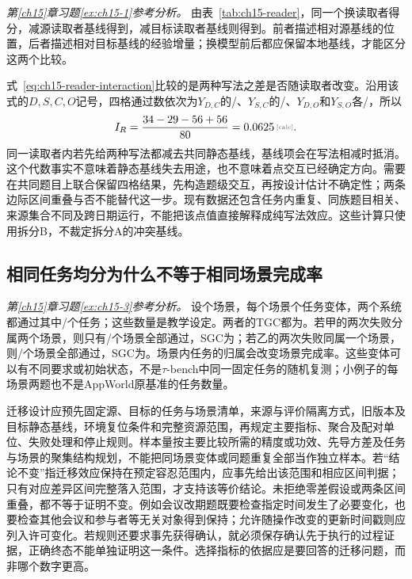 \emph{第\ref{ch15}章习题\ref{ex:ch15-1}参考分析。} 由表~\ref{tab:ch15-reader}，同一个换读取者得分，减源读取者基线得到，减目标读取者基线则得到。前者描述相对源基线的位置，后者描述相对目标基线的经验增量；换模型前后都应保留本地基线，才能区分这两个比较。

式~\ref{eq:ch15-reader-interaction}比较的是两种写法之差是否随读取者改变。沿用该式的$D,S,C,O$记号，四格通过数依次为$Y_{D,C}$的/、$Y_{S,C}$的/、$Y_{D,O}$和$Y_{S,O}$各/，所以
\[
 I_R=\frac{34-29-56+56}{80}=\calcnum{0.0625}.
\]
同一读取者内若先给两种写法都减去共同静态基线，基线项会在写法相减时抵消。这个代数事实不意味着静态基线失去用途，也不意味着点交互已经确定方向。需要在共同题目上联合保留四格结果，先构造题级交互，再按设计估计不确定性；两条边际区间重叠与否不能替代这一步。现有数据还包含任务内重复、同族题目相关、来源集合不同及跨日期运行，不能把该点值直接解释成纯写法效应。这些计算只使用拆分B，不裁定拆分A的冲突基线。

\subsection{相同任务均分为什么不等于相同场景完成率}

\emph{第\ref{ch15}章习题\ref{ex:ch15-3}参考分析。} 设个场景，每个场景个任务变体，两个系统都通过其中/个任务；这些数量是教学设定。两者的TGC都为。若甲的两次失败分属两个场景，则只有/个场景全部通过，SGC为；若乙的两次失败同属一个场景，则/个场景全部通过，SGC为。场景内任务的归属会改变场景完成率。这些变体可以有不同要求或初始状态，不是$\tau$-bench中同一固定任务的随机复测；小例子的每场景两题也不是AppWorld原基准的任务数量。

迁移设计应预先固定源、目标的任务与场景清单，来源与评价隔离方式，旧版本及目标静态基线，环境复位条件和完整资源范围，再规定主要指标、聚合及配对单位、失败处理和停止规则。样本量按主要比较所需的精度或功效、先导方差及任务与场景的聚集结构规划，不能把同场景变体或同题重复全部当作独立样本。若“结论不变”指迁移效应保持在预定容忍范围内，应事先给出该范围和相应区间判据；只有对应差异区间完整落入范围，才支持该等价结论。未拒绝零差假设或两条区间重叠，都不等于证明不变。例如会议改期题既要检查指定时间发生了必要变化，也要检查其他会议和参与者等无关对象得到保持；允许随操作改变的更新时间戳则应列入许可变化。若规则还要求事先获得确认，就必须保存确认先于执行的过程证据，正确终态不能单独证明这一条件。选择指标的依据应是要回答的迁移问题，而非哪个数字更高。

